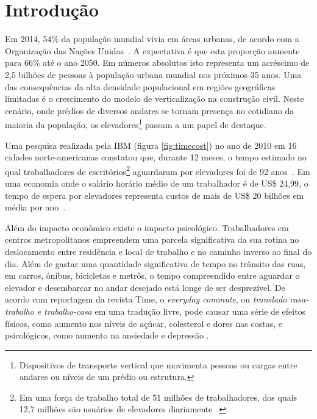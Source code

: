 \chapter{\label{chap:intro}Introdução}


Em 2014, 54\% da população mundial vivia em áreas urbanas, de acordo com a
Organização das Nações Unidas~\cite{UN14}. A expectativa é que esta proporção
aumente para 66\% até o ano 2050. Em números absolutos isto representa um
acréscimo de 2,5 bilhões de pessoas à população urbana mundial nos próximos 35
anos. Uma das consequências da alta densidade populacional em regiões
geográficas limitadas é o crescimento do modelo de verticalização na construção
civil. Neste cenário, onde prédios de diversos andares se tornam presença no
cotidiano da maioria da população, os elevadores\footnote{Dispositivos de
transporte vertical que movimenta pessoas ou cargas entre andares ou níveis de
um prédio ou estrutura.} passam a um papel de destaque.

Uma pesquisa realizada pela IBM (figura \ref{fig:timecost}) no ano de 2010 em 16
cidades norte-americanas constatou que, durante 12 meses, o tempo estimado no
qual trabalhadores de escritórios\footnote{Em uma força de trabalho total de 51
milhões de trabalhadores, dos quais 12,7 milhões são usuários de elevadores
diariamente~\cite{IBM10}.} aguardaram por elevadores foi de 92
anos~\cite{IBM10}. Em uma economia onde o salário horário médio de um
trabalhador é de US\$ 24,99, o tempo de espera por elevadores representa custos
de mais de US\$ 20 bilhões em média por ano~\cite{BLS15}.

Além do impacto econômico existe o impacto psicológico. Trabalhadores em centros
metropolitanos empreendem uma parcela significativa da sua rotina no
deslocamento entre residência e local de trabalho e no caminho inverso ao final
do dia. Além de gastar uma quantidade significativa de tempo no trânsito das
ruas, em carros, ônibus, bicicletas e metrôs, o tempo compreendido entre
aguardar o elevador e desembarcar no andar desejado está longe de ser
desprezível. De acordo com reportagem da revista Time, o \textit{everyday
commute}, ou \textit{translado casa-trabalho e trabalho-casa} em uma tradução
livre, pode causar uma série de efeitos físicos, como aumento nos níveis de
açúcar, colesterol e dores nas costas, e psicológicos, como aumento na ansiedade
e depressão \cite{Kylstra14}.

